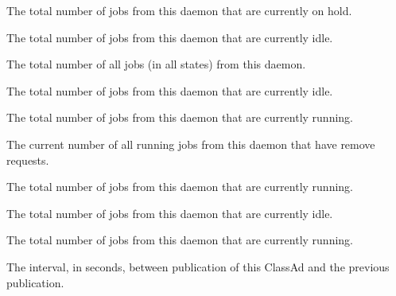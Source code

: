 \begin{description}
\item[\AdAttr{TotalHeldJobs}:] The total number of jobs from this
   daemon that are currently on hold.

\item[\AdAttr{TotalIdleJobs}:] The total number of jobs from this
   daemon that are currently idle.

\item[\AdAttr{TotalJobAds}:] The total number of all jobs (in all 
  states) from this  daemon.

\item[\AdAttr{TotalLocalIdleJobs}:] The total number of 
    jobs from this
   daemon that are currently idle.

\item[\AdAttr{TotalLocalRunningJobs}:] The total number of 
    jobs from this
   daemon that are currently running.

\item[\AdAttr{TotalRemovedJobs}:] The current number of all running jobs
  from this  daemon that have remove requests.

\item[\AdAttr{TotalRunningJobs}:] The total number of jobs from this
   daemon that are currently running.

\item[\AdAttr{TotalSchedulerIdleJobs}:] The total number of 
    jobs from this
   daemon that are currently idle.

\item[\AdAttr{TotalSchedulerRunningJobs}:] The total number of 
    jobs from this
   daemon that are currently running.

\item[\AdAttr{UpdateInterval}:] The interval, in seconds,
  between publication of this  ClassAd and
  the previous publication.


\end{description}

